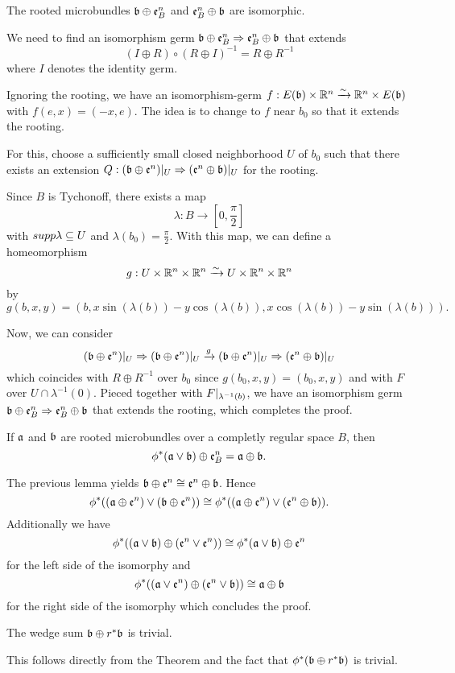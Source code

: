 \begin{mylemma}\label{suspension::commutativity}%
    The rooted microbundles $\mathfrak{b} \oplus \mathfrak{e}^{n}_B$ and $\mathfrak{e}^{n}_B \oplus \mathfrak{b}$ are isomorphic. 
\end{mylemma}
\begin{myproof}
    We need to find an isomorphism germ $\mathfrak{b} \oplus \mathfrak{e}^{n}_B \Rightarrow{} \mathfrak{e}^{n}_B \oplus \mathfrak{b}$ that extends
    \[ (I \oplus R) \circ (R \oplus I)^{-1} = R \oplus R^{-1} \]
    where $I$ denotes the identity germ.

    Ignoring the rooting, we have an isomorphism-germ $f: E(\mathfrak{b}) \times \mathbb{R}^n \xrightarrow{\sim} \mathbb{R}^n \times E(\mathfrak{b})$ with $f(e, x) = (-x, e)$.
    The idea is to change to $f$ near $b_0$ so that it extends the rooting.

    For this, choose a sufficiently small closed neighborhood $U$ of $b_0$
    such that there exists an extension $Q: (\mathfrak{b} \oplus \mathfrak{e}^{n})\vert_{U} \Rightarrow{} (\mathfrak{e}^{n} \oplus \mathfrak{b})\vert_{U}$ for the rooting.

    Since $B$ is Tychonoff, there exists a map
    \[ \lambda: B \to [0, \frac{\pi}{2}] \]
    with $supp \lambda \subseteq{} U$ and $\lambda(b_0) = \frac{\pi}{2}$.
    With this map, we can define a homeomorphism
    \[ g: U \times \mathbb{R}^n \times \mathbb{R}^n \xrightarrow{\sim} U \times \mathbb{R}^n \times \mathbb{R}^n \]
    by
    \[ g(b, x, y) = (b, x \sin(\lambda(b)) - y \cos(\lambda(b)), x \cos(\lambda(b)) - y \sin(\lambda(b))). \]

    Now, we can consider
    \[ (\mathfrak{b} \oplus \mathfrak{e}^{n})\vert_{U} \Rightarrow{} (\mathfrak{b} \oplus \mathfrak{e}^{n})\vert_{U} \xrightarrow{g} (\mathfrak{b} \oplus \mathfrak{e}^{n})\vert_{U} \Rightarrow{} (\mathfrak{e}^{n} \oplus \mathfrak{b})\vert_{U}\]
    which coincides with $R \oplus R^{-1}$ over $b_0$ since $g(b_0, x, y) = (b_0, x, y)$ and with $F$ over $U \cap \lambda^{-1}(0)$.
    Pieced together with $F\vert_{\lambda^{-1}(b)}$, we have an isomorphism germ $\mathfrak{b} \oplus \mathfrak{e}^{n}_B \Rightarrow{} \mathfrak{e}^{n}_B \oplus \mathfrak{b}$ that extends the rooting, which completes the proof.
\end{myproof}

\begin{mytheorem}
    If $\mathfrak{a}$ and $\mathfrak{b}$ are rooted microbundles over a completly regular space $B$, then
    \[ \phi^*(\mathfrak{a} \vee \mathfrak{b}) \oplus \mathfrak{e}^{n}_B = \mathfrak{a} \oplus \mathfrak{b}. \]
\end{mytheorem}
\begin{myproof}
    The previous lemma yields $\mathfrak{b} \oplus \mathfrak{e}^{n} \cong \mathfrak{e}^{n} \oplus \mathfrak{b}$.
    Hence
    \[ \phi^*((\mathfrak{a} \oplus \mathfrak{e}^{n}) \vee (\mathfrak{b} \oplus \mathfrak{e}^{n})) \cong \phi^*((\mathfrak{a} \oplus \mathfrak{e}^{n}) \vee (\mathfrak{e}^{n} \oplus \mathfrak{b})). \]
    Additionally we have
    \[ \phi^*((\mathfrak{a} \vee \mathfrak{b}) \oplus (\mathfrak{e}^{n} \vee \mathfrak{e}^{n})) \cong \phi^*(\mathfrak{a} \vee \mathfrak{b}) \oplus \mathfrak{e}^{n} \]
    for the left side of the isomorphy and
    \[ \phi^*((\mathfrak{a} \vee \mathfrak{e}^{n}) \oplus (\mathfrak{e}^{n} \vee \mathfrak{b})) \cong \mathfrak{a} \oplus \mathfrak{b}\]
    for the right side of the isomorphy which concludes the proof.
\end{myproof}

\begin{mycorollary}
    The wedge sum $\mathfrak{b} \oplus r^*\mathfrak{b}$ is trivial.
\end{mycorollary}
\begin{myproof}
    This follows directly from the Theorem and the fact that $\phi^*(\mathfrak{b} \oplus r^*\mathfrak{b})$ is trivial.
\end{myproof}

